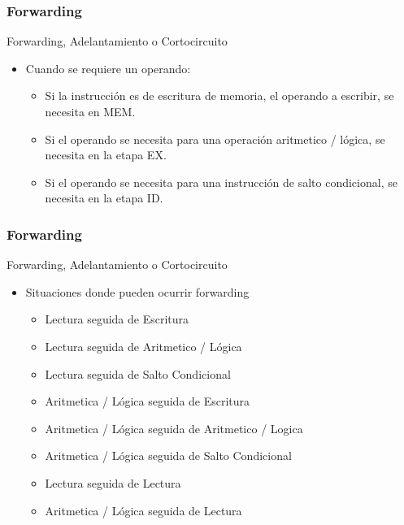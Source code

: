 \documentclass{beamer}
\begin{document}
\begin{frame}[fragile]
\frametitle{Forwarding}
Forwarding, Adelantamiento o Cortocircuito
\begin{itemize}
\item Cuando se requiere un operando:
\begin{itemize}
\item Si la instrucción es de escritura de memoria, el operando a escribir, se necesita en MEM.
\item Si el operando se necesita para una operación aritmetico / lógica, se necesita en la etapa EX.
\item Si el operando se necesita para una instrucción de salto condicional, se necesita en la etapa ID.
\end{itemize}
\end{itemize}
\end{frame}

\begin{frame}[fragile]
\frametitle{Forwarding}
Forwarding, Adelantamiento o Cortocircuito
\begin{itemize}
\item Situaciones donde pueden ocurrir forwarding
\begin{itemize}
\item Lectura seguida de Escritura
\item Lectura seguida de Aritmetico / Lógica
\item Lectura seguida de Salto Condicional
\item Aritmetica / Lógica seguida de Escritura
\item Aritmetica / Lógica seguida de Aritmetico / Logica
\item Aritmetica / Lógica seguida de Salto Condicional
\item Lectura seguida de Lectura 
\item Aritmetica / Lógica seguida de Lectura
\end{itemize}
\end{itemize}
\end{frame}
\end{document}
